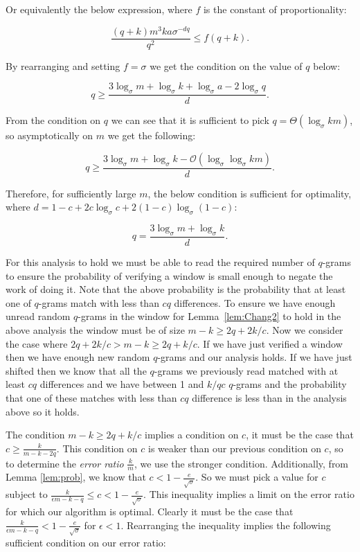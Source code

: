 \documentclass[runningheads, envcountsame, a4paper]{llncs}\usepackage{etex}
\newcommand{\cO}{\mathcal{O}}
\begin{document}
\noindent Or equivalently the below expression, where $f$ is the constant of proportionality:

$$\frac{(q+k)m^3ka\sigma^{-dq}}{q^2} \leq f(q + k).$$

\noindent By rearranging and setting $f = \sigma$ we get the condition on the value of $q$ below:

$$q \geq \frac{3\log_\sigma m + \log_\sigma k + \log_\sigma a - 2\log_\sigma q}{d}.$$

\noindent From the condition on $q$ we can see that it is sufficient to pick $q = \Theta(\log_\sigma km)$, so asymptotically on $m$ we get the following:

$$q \geq \frac{3\log_\sigma m + \log_\sigma k - \cO(\log_\sigma \log_\sigma km)}{d}.$$

\noindent Therefore, for sufficiently large $m$, the below condition is sufficient for optimality, where $d=1 - c + 2c \log_\sigma c + 2(1 - c) \log_\sigma (1 - c)$:

$$q = \frac{3 \log_\sigma m + \log_\sigma k}{d}.$$

\noindent For this analysis to hold we must be able to read the required number of $q$-grams to ensure the probability of verifying a window is small enough to negate the work of doing it. Note that the above probability is the probability that at least one of $q$-grams match with less than $cq$ differences. To ensure we have enough unread random $q$-grams in the window for Lemma~\ref{lem:Chang2} to hold in the above analysis the window must be of size $m-k \geq 2q + 2k/c$. Now we consider the case where $2q + 2k/c > m-k \geq 2q + k/c$. If we have just verified a window then we have enough new random $q$-grams and our analysis holds. If we have just shifted then we know that all the $q$-grams we previously read matched with at least $cq$ differences and we have between 1 and $k/qc$ $q$-grams and the probability that one of these matches with less than $cq$ difference is less than in the analysis above so it holds.

The condition $m-k \geq 2q + k/c$ implies a condition on $c$, it must be the case that $c \geq \frac{k}{m-k-2q}$. This condition on $c$ is weaker than our previous condition on $c$, so to determine the {\em error ratio} $\frac{k}{m}$, we use the stronger condition. Additionally, from Lemma \ref{lem:prob}, we know that $c < 1 - \frac{e}{\sqrt{\sigma}}$.  So we must pick a value for $c$ subject to $ \frac{k}{\epsilon m-k-q} \leq c < 1- \frac{e}{\sqrt{\sigma}}$.
This inequality implies a limit on the error ratio for which our algorithm is optimal. Clearly it must be the case that $\frac{k}{\epsilon m-k-q} <1- \frac{e}{\sqrt{\sigma}}$ for $\epsilon <1$. 
Rearranging the inequality implies the following sufficient condition on our error ratio: 
\end{document}
